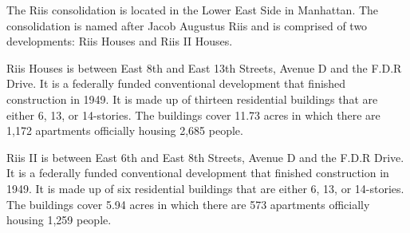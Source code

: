 The Riis consolidation is located in the Lower East Side in Manhattan. The consolidation is named after Jacob Augustus Riis and is comprised of two developments: Riis Houses and Riis II Houses.\par \vspace{.7\baselineskip}Riis Houses is between East 8th and East 13th Streets, Avenue D and the F.D.R Drive. It is a federally funded conventional development that finished construction in 1949. It is made up of thirteen residential buildings that are either 6, 13, or 14-stories. The buildings cover 11.73 acres in which there are 1,172 apartments officially housing 2,685 people. \par \vspace{.7\baselineskip}Riis II is between East 6th and East 8th Streets, Avenue D and the F.D.R Drive. It is a federally funded conventional development that finished construction in 1949. It is made up of six residential buildings that are either 6, 13, or 14-stories. The buildings cover 5.94 acres in which there are 573 apartments officially housing 1,259 people.